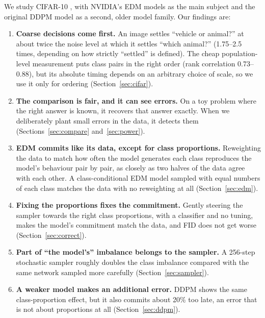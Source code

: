 \documentclass[11pt]{article}
\begin{document}
We study CIFAR-10 \citep{krizhevsky2009learning}, with NVIDIA's EDM models \citep{karras2022elucidating} as the main subject and the original DDPM model \citep{ho2020denoising} as a second, older model family. Our findings are:
\begin{enumerate}[leftmargin=*]
\item \textbf{Coarse decisions come first.} An image settles ``vehicle or animal?'' at about twice the noise level at which it settles ``which animal?'' (1.75--2.5 times, depending on how strictly ``settled'' is defined). The cheap population-level measurement puts class pairs in the right order (rank correlation 0.73--0.88), but its absolute timing depends on an arbitrary choice of scale, so we use it only for ordering (Section~\ref{sec:cifar}).
\item \textbf{The comparison is fair, and it can see errors.} On a toy problem where the right answer is known, it recovers that answer exactly. When we deliberately plant small errors in the data, it detects them (Sections~\ref{sec:compare} and~\ref{sec:power}).
\item \textbf{EDM commits like its data, except for class proportions.} Reweighting the data to match how often the model generates each class reproduces the model's behaviour pair by pair, as closely as two halves of the data agree with each other. A class-conditional EDM model sampled with equal numbers of each class matches the data with no reweighting at all (Section~\ref{sec:edm}).
\item \textbf{Fixing the proportions fixes the commitment.} Gently steering the sampler towards the right class proportions, with a classifier and no tuning, makes the model's commitment match the data, and FID does not get worse (Section~\ref{sec:correct}).
\item \textbf{Part of ``the model's'' imbalance belongs to the sampler.} A 256-step stochastic sampler roughly doubles the class imbalance compared with the same network sampled more carefully (Section~\ref{sec:sampler}).
\item \textbf{A weaker model makes an additional error.} DDPM shows the same class-proportion effect, but it also commits about 20\% too late, an error that is not about proportions at all (Section~\ref{sec:ddpm}).
\end{enumerate}
\end{document}
